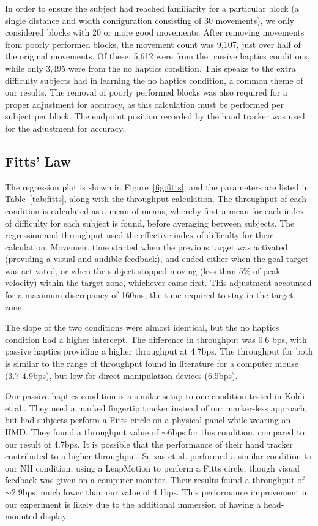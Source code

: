 \documentclass[]{aiaa-tc}%
\begin{document}
In order to ensure the subject had reached familiarity for a particular block (a single distance and width configuration consisting of 30 movements), we only considered blocks with 20 or more good movements.
After removing movements from poorly performed blocks, the movement count was 9,107, just over half of the original movements.
Of these, 5,612 were from the passive haptics conditions, while only 3,495 were from the no haptics condition.
This speaks to the extra difficulty subjects had in learning the no haptics condition, a common theme of our results.
The removal of poorly performed blocks was also required for a proper adjustment for accuracy, as this calculation must be performed per subject per block.
The endpoint position recorded by the hand tracker was used for the adjustment for accuracy.

\subsection{Fitts' Law}

The regression plot is shown in Figure~\ref{fig:fitts}, and the parameters are listed in Table~\ref{tab:fitts}, along with the throughput calculation.
The throughput of each condition is calculated as a mean-of-means, whereby first a mean for each index of difficulty for each subject is found, before averaging between subjects.
The regression and throughput used the effective index of difficulty for their calculation.
Movement time started when the previous target was activated (providing a visual and audible feedback), and ended either when the goal target was activated, or when the subject stopped moving (less than 5\% of peak velocity) within the target zone, whichever came first.
This adjustment accounted for a maximum discrepancy of 160ms, the time required to stay in the target zone.

The slope of the two conditions were almost identical, but the no haptics condition had a higher intercept.
The difference in throughput was 0.6 bps, with passive haptics providing a higher throughput at 4.7bps.
The throughput for both is similar to the range of throughput found in literature for a computer mouse (3.7-4.9bps)\cite{soukoreff_towards_2004}, but low for direct manipulation devices (6.5bps)\cite{mackenzie_fitts_2015}.

Our passive haptics condition is a similar setup to one condition tested in Kohli et al.\cite{kohli_redirected_2012}.
They used a marked fingertip tracker instead of our marker-less approach, but had subjects perform a Fitts circle on a physical panel while wearing an HMD.
They found a throughput value of $\sim$6bps for this condition, compared to our result of 4.7bps.
It is possible that the performance of their hand tracker contributed to a higher throughput.
Seixas et al.\cite{seixas_one_2015} performed a similar condition to our NH condition, using a LeapMotion to perform a Fitts circle, though visual feedback was given on a computer monitor.
Their results found a throughput of $\sim$2.9bps, much lower than our value of 4.1bps.
This performance improvement in our experiment is likely due to the additional immersion of having a head-mounted display.
\end{document}
